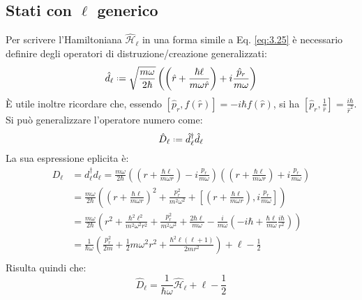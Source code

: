 \subsection{Stati con \texorpdfstring{$ \ell $}{TEXT} generico}

Per scrivere l'Hamiltoniana $ \hat{\mathcal{H}}_{\ell} $ in una forma simile a Eq. \ref{eq:3.25} è necessario definire degli operatori di distruzione/creazione generalizzati:
\begin{equation}
	\hat{d}_{\ell} \defeq \sqrt{\frac{m\omega}{2\hbar}} \left( \left( \hat{r} + \frac{\hbar\ell}{m\omega\hat{r}} \right) + i \frac{\hat{p}_r}{m\omega} \right)
	\label{eq:3.28}
\end{equation}
È utile inoltre ricordare che, essendo $ \left[ \hat{p}_r, f(\hat{r}) \right] = -i\hbar f(\hat{r}) $, si ha $ \left[ \hat{p}_r, \frac{1}{\hat{r}} \right] = \frac{i\hbar}{\hat{r}^2} $.\\
Si può generalizzare l'operatore numero come:
\begin{equation}
	\hat{D}_{\ell} \defeq \hat{d}_{\ell}^{\dagger} \hat{d}_{\ell}
	\label{eq:3.29}
\end{equation}
La sua espressione eplicita è:
\begin{equation*}
	\begin{split}
		D_{\ell}
		&= d_{\ell}^{\dagger} d_{\ell} = \frac{m\omega}{2\hbar} \left( \left( r + \frac{\hbar\ell}{m\omega r} \right) - i \frac{p_r}{m\omega} \right) \left( \left( r + \frac{\hbar\ell}{m\omega r} \right) + i \frac{p_r}{m\omega} \right)\\
		&= \frac{m\omega}{2\hbar} \left( \left( r + \frac{\hbar\ell}{m\omega r} \right)^2 + \frac{p_r^2}{m^2 \omega^2} + \left[ \left( r + \frac{\hbar\ell}{m\omega r} \right), i \frac{p_r}{m\omega} \right] \right)\\
		&= \frac{m\omega}{2\hbar} \left( r^2 + \frac{\hbar^2\ell^2}{m^2 \omega^2 r^2} + \frac{p_r^2}{m^2 \omega^2} + \frac{2\hbar\ell}{m\omega} - \frac{i}{m\omega} \left( -i\hbar + \frac{\hbar\ell}{m\omega} \frac{i\hbar}{r^2} \right) \right)\\
		&= \frac{1}{\hbar\omega} \left( \frac{p_r^2}{2m} + \frac{1}{2}m\omega^2 r^2 + \frac{\hbar^2 \ell (\ell + 1)}{2mr^2} \right) + \ell - \frac{1}{2}\\
	\end{split}
\end{equation*}
Risulta quindi che:
\begin{equation}
	\hat{D}_{\ell} = \frac{1}{\hbar\omega} \hat{\mathcal{H}}_{\ell} + \ell - \frac{1}{2}
	\label{eq:3.30}
\end{equation}
